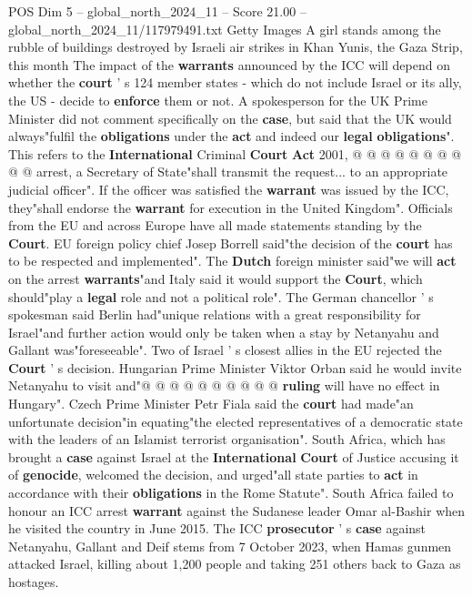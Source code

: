 \begin{textsample}{POS Dim 5 – global\_north\_2024\_11 – Score 21.00 – global\_north\_2024\_11/117979491.txt}
Getty Images A girl stands among the rubble of buildings destroyed by Israeli air strikes in Khan Yunis, the Gaza Strip, this month The impact of the \textbf{warrants} announced by the ICC will depend on whether the \textbf{court} ' s 124 member states - which do not include Israel or its ally, the US - decide to \textbf{enforce} them or not.
A spokesperson for the UK Prime Minister did not comment specifically on the \textbf{case}, but said that the UK would always"fulfil the \textbf{obligations} under the \textbf{act} and indeed our \textbf{legal} \textbf{obligations}".
This refers to the \textbf{International} Criminal \textbf{Court} \textbf{Act} 2001, @ @ @ @ @ @ @ @ @ @ arrest, a Secretary of State"shall transmit the request... to an appropriate judicial officer".
If the officer was satisfied the \textbf{warrant} was issued by the ICC, they"shall endorse the \textbf{warrant} for execution in the United Kingdom".
Officials from the EU and across Europe have all made statements standing by the \textbf{Court}.
EU foreign policy chief Josep Borrell said"the decision of the \textbf{court} has to be respected and implemented".
The \textbf{Dutch} foreign minister said"we will \textbf{act} on the arrest \textbf{warrants}"and Italy said it would support the \textbf{Court}, which should"play a \textbf{legal} role and not a political role".
The German chancellor ' s spokesman said Berlin had"unique relations with a great responsibility for Israel"and further action would only be taken when a stay by Netanyahu and Gallant was"foreseeable".
Two of Israel ' s closest allies in the EU rejected the \textbf{Court} ' s decision.
Hungarian Prime Minister Viktor Orban said he would invite Netanyahu to visit and"@ @ @ @ @ @ @ @ @ @ \textbf{ruling} will have no effect in Hungary".
Czech Prime Minister Petr Fiala said the \textbf{court} had made"an unfortunate decision"in equating"the elected representatives of a democratic state with the leaders of an Islamist terrorist organisation".
South Africa, which has brought a \textbf{case} against Israel at the \textbf{International} \textbf{Court} of Justice accusing it of \textbf{genocide}, welcomed the decision, and urged"all state parties to \textbf{act} in accordance with their \textbf{obligations} in the Rome Statute".
South Africa failed to honour an ICC arrest \textbf{warrant} against the Sudanese leader Omar al-Bashir when he visited the country in June 2015.
The ICC \textbf{prosecutor} ' s \textbf{case} against Netanyahu, Gallant and Deif stems from 7 October 2023, when Hamas gunmen attacked Israel, killing about 1,200 people and taking 251 others back to Gaza as hostages.

\end{textsample}
